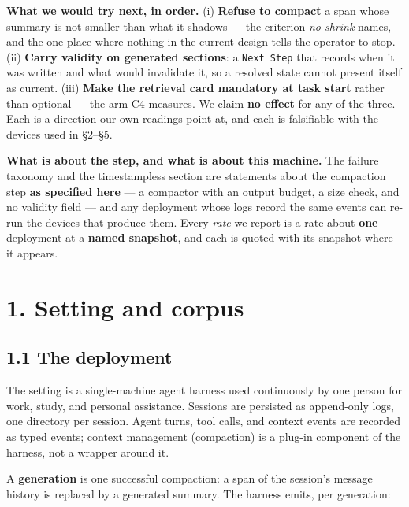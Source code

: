 \documentclass[
]{article}
\begin{document}
\textbf{What we would try next, in order.} (i) \textbf{Refuse to
compact} a span whose summary is not smaller than what it shadows ---
the criterion \emph{no-shrink} names, and the one place where nothing in
the current design tells the operator to stop. (ii) \textbf{Carry
validity on generated sections}: a \texttt{Next\ Step} that records when
it was written and what would invalidate it, so a resolved state cannot
present itself as current. (iii) \textbf{Make the retrieval card
mandatory at task start} rather than optional --- the arm C4 measures.
We claim \textbf{no effect} for any of the three. Each is a direction
our own readings point at, and each is falsifiable with the devices used
in §2--§5.

\textbf{What is about the step, and what is about this machine.} The
failure taxonomy and the timestampless section are statements about the
compaction step \textbf{as specified here} --- a compactor with an
output budget, a size check, and no validity field --- and any
deployment whose logs record the same events can re-run the devices that
produce them. Every \emph{rate} we report is a rate about \textbf{one}
deployment at a \textbf{named snapshot}, and each is quoted with its
snapshot where it appears.

\section{1. Setting and corpus}\label{setting-and-corpus}

\subsection{1.1 The deployment}\label{the-deployment}

The setting is a single-machine agent harness used continuously by one
person for work, study, and personal assistance. Sessions are persisted
as append-only logs, one directory per session. Agent turns, tool calls,
and context events are recorded as typed events; context management
(compaction) is a plug-in component of the harness, not a wrapper around
it.

A \textbf{generation} is one successful compaction: a span of the
session's message history is replaced by a generated summary. The
harness emits, per generation:
\end{document}
